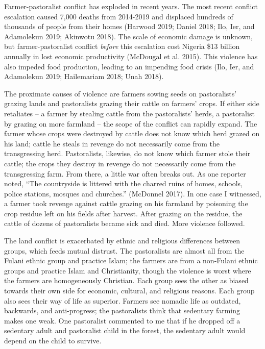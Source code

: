 \documentclass[11pt]{article}
\begin{document}
Farmer-pastoralist conflict has exploded in recent years. The most
recent conflict escalation caused 7,000 deaths from 2014-2019 and
displaced hundreds of thousands of people from their homes (Harwood
2019; Daniel 2018; Ilo, Ier, and Adamolekun 2019; Akinwotu 2018). The
scale of economic damage is unknown, but farmer-pastoralist conflict
\emph{before} this escalation cost Nigeria \$13 billion annually in lost
economic productivity (McDougal et al. 2015). This violence has also
impeded food production, leading to an impending food crisis (Ilo, Ier,
and Adamolekun 2019; Hailemariam 2018; Unah 2018).

The proximate causes of violence are farmers sowing seeds on
pastoralists' grazing lands and pastoralists grazing their cattle on
farmers' crops. If either side retaliates -- a farmer by stealing cattle
from the pastoralists' herds, a pastoralist by grazing on more farmland
-- the scope of the conflict can rapidly expand. The farmer whose crops
were destroyed by cattle does not know which herd grazed on his land;
cattle he steals in revenge do not necessarily come from the
transgressing herd. Pastoralists, likewise, do not know which farmer
stole their cattle; the crops they destroy in revenge do not necessarily
come from the transgressing farm. From there, a little war often breaks
out. As one reporter noted, ``The countryside is littered with the
charred ruins of homes, schools, police stations, mosques and
churches.'' (McDonnel 2017). In one case I witnessed, a farmer took
revenge against cattle grazing on his farmland by poisoning the crop
residue left on his fields after harvest. After grazing on the residue,
the cattle of dozens of pastoralists became sick and died. More violence
followed.

The land conflict is exacerbated by ethnic and religious differences
between groups, which feeds mutual distrust. The pastoralists are almost
all from the Fulani ethnic group and practice Islam; the farmers are
from a non-Fulani ethnic groups and practice Islam and Christianity,
though the violence is worst where the farmers are homogeneously
Christian. Each group sees the other as biased towards their own side
for economic, cultural, and religious reasons. Each group also sees
their way of life as superior. Farmers see nomadic life as outdated,
backwards, and anti-progress; the pastoralists think that sedentary
farming makes one weak. One pastoralist commented to me that if he
dropped off a sedentary adult and pastoralist child in the forest, the
sedentary adult would depend on the child to survive.
\end{document}
